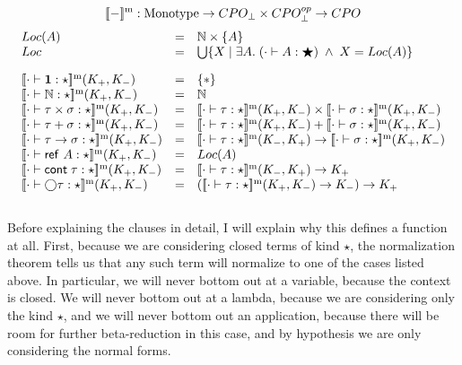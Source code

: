 \documentclass[12pt]{article}
\begin{document}
\begin{displaymath}
[\![{-}]\!]^{\mathrm{m}} : \mbox{Monotype} \to CPO_\bot \times CPO^{op}_\bot \to CPO   
\end{displaymath}
\begin{displaymath}
\begin{array}{lcl}
Loc(A) & = & \N \times \setof{A} \\
Loc    & = & \bigcup \setof{X \;|\; \exists A.\; (\judgeWK[\cdot]{A}{\bigstar}) \;\land\;X = Loc(A)} \\[1em]

\interpmono{\judgeWK[\cdot]{\unittype}{\star}}(K_+, K_-) & = & \setof{*} \\

\interpmono{\judgeWK[\cdot]{\N}{\star}}(K_+, K_-) & = &  \N \\

\interpmono{\judgeWK[\cdot]{\tau \times \sigma}{\star}}(K_+, K_-) & = & 
  \interpmono{\judgeWK[\cdot]{\tau}{\star}}(K_+, K_-) \times 
  \interpmono{\judgeWK[\cdot]{\sigma}{\star}}(K_+, K_-) \\

\interpmono{\judgeWK[\cdot]{\tau + \sigma}{\star}}(K_+, K_-) & = & 
  \interpmono{\judgeWK[\cdot]{\tau}{\star}}(K_+, K_-) + 
  \interpmono{\judgeWK[\cdot]{\sigma}{\star}}(K_+, K_-) \\


\interpmono{\judgeWK[\cdot]{\tau \to \sigma}{\star}}(K_+, K_-) & = & 
  \interpmono{\judgeWK[\cdot]{\tau}{\star}}(K_-, K_+) \to
  \interpmono{\judgeWK[\cdot]{\sigma}{\star}}(K_+, K_-) \\

\interpmono{\judgeWK[\cdot]{\reftype{A}}{\star}}(K_+, K_-) & = & Loc(A) \\

\interpmono{\judgeWK[\cdot]{\cont{\tau}}{\star}}(K_+, K_-) & = & 
    \interpmono{\judgeWK[\cdot]{\tau}{\star}}(K_-,K_+) \to K_+ \\

\interpmono{\judgeWK[\cdot]{\monad{\tau}}{\star}}(K_+, K_-) & = & 
   (\interpmono{\judgeWK[\cdot]{\tau}{\star}}(K_+, K_-) \to K_-) \to K_+ \\[1em]
\end{array}
\end{displaymath}

Before explaining the clauses in detail, I will explain why this
defines a function at all. First, because we are considering closed
terms of kind $\star$, the normalization theorem tells us that any
such term will normalize to one of the cases listed above. In
particular, we will never bottom out at a variable, because the
context is closed. We will never bottom out at a lambda, because we
are considering only the kind $\star$, and we will never bottom out an
application, because there will be room for further beta-reduction in
this case, and by hypothesis we are only considering the normal forms.
\end{document}
